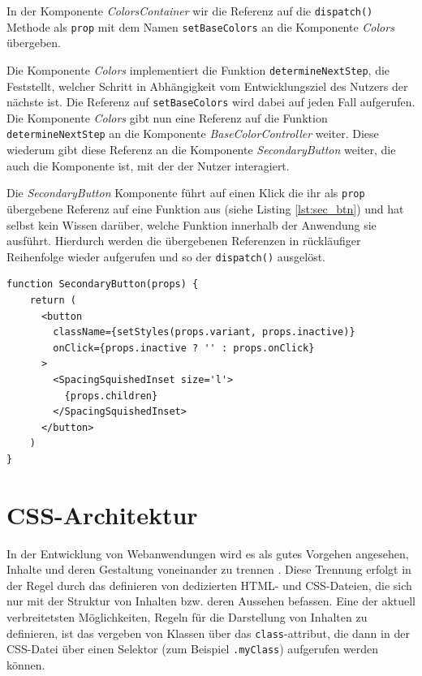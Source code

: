 In der Komponente \textit{ColorsContainer} wir die Referenz auf die \verb|dispatch()| Methode als \verb|prop| mit dem Namen \verb|setBaseColors| an die Komponente \textit{Colors} übergeben.

Die Komponente \textit{Colors} implementiert die Funktion \verb|determineNextStep|, die Feststellt, welcher Schritt in Abhängigkeit vom Entwicklungsziel des Nutzers der nächste ist. Die Referenz auf \verb|setBaseColors| wird dabei auf jeden Fall aufgerufen. Die Komponente \textit{Colors} gibt nun eine Referenz auf die Funktion \verb|determineNextStep| an die Komponente \textit{BaseColorController} weiter. Diese wiederum gibt diese Referenz an die Komponente \textit{SecondaryButton} weiter, die auch die Komponente ist, mit der der Nutzer interagiert.

Die \textit{SecondaryButton} Komponente führt auf einen Klick die ihr als \verb|prop| übergebene Referenz auf eine Funktion aus (siehe Listing \ref{lst:sec_btn}) und hat selbst kein Wissen darüber, welche Funktion innerhalb der Anwendung sie ausführt. Hierdurch werden die übergebenen Referenzen in rückläufiger Reihenfolge wieder aufgerufen und so der \verb|dispatch()| ausgelöst.

\begin{lstlisting}[caption={Aufruf der übergebenen Funktion in der Komponente \textit{SecondaryButton}}, label=lst:sec_btn]
  function SecondaryButton(props) {
    return (
      <button
        className={setStyles(props.variant, props.inactive)}
        onClick={props.inactive ? '' : props.onClick}
      >
        <SpacingSquishedInset size='l'>
          {props.children}
        </SpacingSquishedInset>
      </button>
    )
}
\end{lstlisting}

\section{CSS-Architektur}
In der Entwicklung von Webanwendungen wird es als gutes Vorgehen angesehen, Inhalte und deren Gestaltung voneinander zu trennen \cite[S. 56]{goodman2002dynamic}. Diese Trennung erfolgt in der Regel durch das definieren von dedizierten HTML- und CSS-Dateien, die sich nur mit der Struktur von Inhalten bzw. deren Aussehen befassen.
Eine der aktuell verbreitetsten Möglichkeiten, Regeln für die Darstellung von Inhalten zu definieren, ist das vergeben von Klassen über das \verb|class|-attribut, die dann in der CSS-Datei über einen Selektor (zum Beispiel \verb|.myClass|) aufgerufen werden können.

